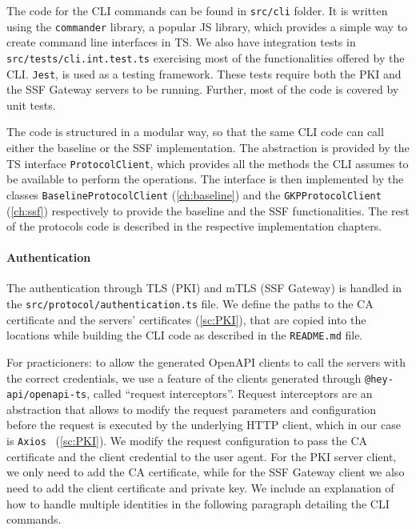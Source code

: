 The code for the CLI commands can be found in \texttt{src/cli} folder.
It is written using the \texttt{commander} library, a popular
JS library, which provides a simple way to 
create command line interfaces in TS.
We also have integration tests in \texttt{src/tests/cli.int.test.ts}
exercising most of the functionalities offered by the CLI.
\texttt{Jest}, is used as a testing framework.
These tests require both the PKI and the SSF Gateway servers to be running.
Further, most of the code is covered by unit tests.

The code is structured in a modular way, so that the same CLI
code can call either the baseline or the SSF implementation.
The abstraction is provided by the TS interface \texttt{ProtocolClient},
which provides all the methods the CLI assumes to be available
to perform the operations. The interface is then
implemented by the classes \texttt{BaselineProtocolClient} (\cref{ch:baseline})
and the \texttt{GKPProtocolClient} (\cref{ch:ssf})
respectively to provide the baseline and the SSF functionalities.
The rest of the protocols code is described in the respective
implementation chapters.

\paragraph{Authentication}
The authentication through TLS (PKI) and mTLS (SSF Gateway)
is handled in the \texttt{src/protocol/authentication.ts} file.
We define the paths to the CA certificate and 
the servers' certificates (\cref{sc:PKI}), that are copied
into the locations while building the CLI code
as described in the \texttt{README.md} file.

For practicioners: to allow the generated OpenAPI clients to call
the servers with the correct credentials,
we use a feature of the clients generated through \texttt{@hey-api/openapi-ts}, called ``request interceptors''.
Request interceptors are an abstraction that allows
to modify the request parameters and configuration
before the request is executed by the underlying HTTP client,
which in our case is \texttt{Axios}~\cite{OpenAPIAxios} (\cref{sc:PKI}).
We modify the request configuration to pass the
CA certificate and the client credential
to the user agent. For the PKI server client,
we only need to add the CA certificate,
while for the SSF Gateway client we also need to
add the client certificate and private key.
We include an explanation of how to handle multiple
identities in the following paragraph detailing the CLI commands.

